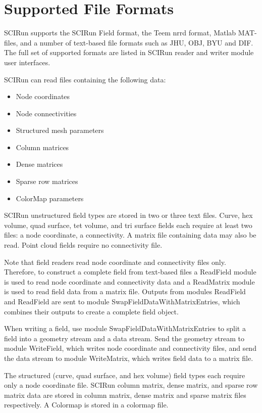 \documentclass[fleqn,12pt,openany]{book}
\begin{document}
\chapter{Supported File Formats}\label{sec:formats}

SCIRun supports the SCIRun Field format, the Teem nrrd format, Matlab MAT-files, and a number
of text-based file formats such as JHU, OBJ, BYU and DIF.
The full set of supported formats are listed in SCIRun reader and writer module user interfaces.

SCIRun can read files containing the following data:

\begin{itemize}
  \item Node coordinates
  \item Node connectivities
  \item Structured mesh parameters
  \item Column matrices
  \item Dense matrices
  \item Sparse row matrices
  \item ColorMap parameters 
\end{itemize}

SCIRun unstructured field types are stored in two or three text files.
Curve, hex volume, quad surface, tet volume, and tri surface fields each require at least two files:
a node coordinate, a connectivity.
A matrix file containing data may also be read.
Point cloud fields require no connectivity file.

Note that field readers read node coordinate and connectivity files only.
Therefore, to construct a complete field from text-based files a ReadField module is used to read node
coordinate and connectivity data
and a ReadMatrix module is used to read field data from a matrix file.
Outputs from modules ReadField and ReadField are sent to module SwapFieldDataWithMatrixEntries, which 
combines their outputs to create a complete field object.

When writing a field, use module SwapFieldDataWithMatrixEntries to split a field into a geometry stream
and a data stream.
Send the geometry stream to module WriteField, which writes node coordinate and connectivity files,
and send the data stream to module WriteMatrix, which writes field data to a matrix file.

The structured (curve, quad surface, and hex volume) field types each require only a node coordinate file.
SCIRun column matrix, dense matrix, and sparse row matrix data are stored in column matrix, dense
matrix and sparse matrix files respectively.
A Colormap is stored in a colormap file.
\end{document}

